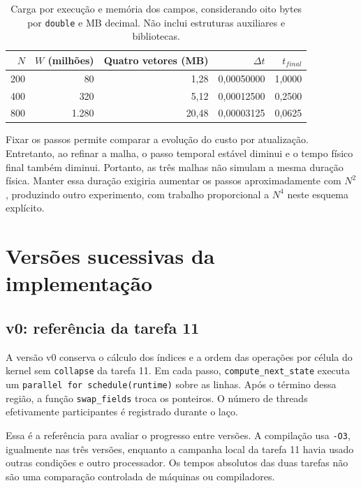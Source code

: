 \documentclass[12pt,a4paper]{article}
\begin{document}
\begin{table}[H]
\centering\small
\begin{tabular}{rrrrr}
\toprule
$N$ & $W$ (milhões) & Quatro vetores (MB) & $\Delta t$ & $t_{final}$\\
\midrule
200 & 80 & 1,28 & 0,00050000 & 1,0000\\
400 & 320 & 5,12 & 0,00012500 & 0,2500\\
800 & 1.280 & 20,48 & 0,00003125 & 0,0625\\
\bottomrule
\end{tabular}
\caption{Carga por execução e memória dos campos, considerando oito bytes por \texttt{double} e MB decimal. Não inclui estruturas auxiliares e bibliotecas.}
\label{tab:carga}
\end{table}

Fixar os passos permite comparar a evolução do custo por atualização. Entretanto, ao refinar a malha, o passo temporal estável diminui e o tempo físico final também diminui. Portanto, as três malhas não simulam a mesma duração física. Manter essa duração exigiria aumentar os passos aproximadamente com $N^2$, produzindo outro experimento, com trabalho proporcional a $N^4$ neste esquema explícito.

\section{Versões sucessivas da implementação}


\subsection{v0: referência da tarefa 11}
A versão v0 conserva o cálculo dos índices e a ordem das operações por célula do kernel sem \texttt{collapse} da tarefa 11. Em cada passo, \texttt{compute\_next\_state} executa um \texttt{parallel for schedule(runtime)} sobre as linhas. Após o término dessa região, a função \texttt{swap\_fields} troca os ponteiros. O número de threads efetivamente participantes é registrado durante o laço.

Essa é a referência para avaliar o progresso entre versões. A compilação usa \texttt{-O3}, igualmente nas três versões, enquanto a campanha local da tarefa 11 havia usado outras condições e outro processador. Os tempos absolutos das duas tarefas não são uma comparação controlada de máquinas ou compiladores.
\end{document}
